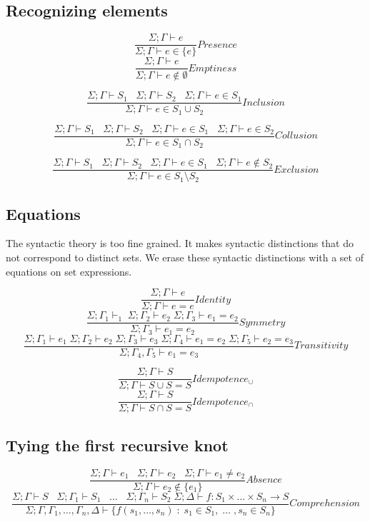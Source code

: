 \subsection{Recognizing elements}
\[\frac{ \Sigma; \Gamma \vdash e }{ \Sigma; \Gamma \vdash e \in \{ e \}}Presence\]
\[\frac{ \Sigma; \Gamma \vdash e }{ \Sigma; \Gamma \vdash e \notin \emptyset}Emptiness\]

\[\frac{ \Sigma; \Gamma \vdash S_{1} \;\;\; \Sigma; \Gamma \vdash S_{2} \;\;\; \Sigma; \Gamma \vdash e \in S_{1}}{ \Sigma; \Gamma \vdash e \in S_{1} \cup S_{2}}Inclusion\]

\[\frac{ \Sigma; \Gamma \vdash S_{1} \;\;\; \Sigma; \Gamma \vdash S_{2} \;\;\; \Sigma; \Gamma \vdash e \in S_{1} \;\;\; \Sigma; \Gamma \vdash e \in S_{2}}{ \Sigma; \Gamma \vdash e \in S_{1} \cap S_{2}}Collusion\]

\[\frac{ \Sigma; \Gamma \vdash S_{1} \;\;\; \Sigma; \Gamma \vdash S_{2} \;\;\; \Sigma; \Gamma \vdash e \in S_{1} \;\;\; \Sigma; \Gamma \vdash e \notin S_{2}}{ \Sigma; \Gamma \vdash e \in S_{1} \setminus S_{2}}Exclusion\]

\subsection{Equations}\label{equations}

The syntactic theory is too fine grained. It makes syntactic
distinctions that do not correspond to distinct sets. We erase these
syntactic distinctions with a set of equations on set expressions.

\[\frac{ \Sigma; \Gamma \vdash e }{ \Sigma; \Gamma  \vdash e = e}Identity\]
\[\frac{\Sigma; \Gamma_{1} \vdash _{1}\; \Sigma; \Gamma_{2} \vdash e_{2}\; \Sigma; \Gamma_{3}  \vdash e_{1} = e_{2}}{ \Sigma; \Gamma_{3}  \vdash e_{1} = e_{2}}Symmetry\]
\[\frac{\Sigma; \Gamma_{1}  \vdash e_{1}\; \Sigma; \Gamma_{2}  \vdash e_{2}\; \Sigma; \Gamma_{3} \vdash e_{3}\; \Sigma; \Gamma_{4}  \vdash e_{1} = e_{2} \; \Sigma; \Gamma_{5}  \vdash e_{2} = e_{3}}{ \Sigma; \Gamma_{4},\Gamma_{5}  \vdash e_{1} = e_{3}}Transitivity\]

\[\frac{\Sigma; \Gamma  \vdash S}{\Sigma; \Gamma \vdash S \cup S =  S}Idempotence_{\cup}\]
\[\frac{\Sigma; \Gamma  \vdash S}{\Sigma; \Gamma \vdash S \cap S =  S}Idempotence_{\cap}\]

\subsection{Tying the first recursive knot}
\[\frac{ \Sigma; \Gamma \vdash e_{1} \;\;\; \Sigma; \Gamma \vdash e_{2} \;\;\; \Sigma; \Gamma \vdash e_{1} \neq e_{2} }{ \Sigma; \Gamma \vdash e_{2} \notin \{ e_{1}\}}Absence\]
\[\frac{ \Sigma; \Gamma \vdash S \;\;\; \Sigma; \Gamma_{1} \vdash S_{1} \;\;\;\ldots\;\;\; \Sigma; \Gamma_{n} \vdash S_{2}\; \Sigma; \Delta \vdash f : S_{1} \times \ldots \times S_{n} \to S }{ \Sigma; \Gamma,\Gamma_{1},\ldots, \Gamma_{n},\Delta \vdash \{ f(s_{1},\ldots,s_{n}) \; : \; s_{1} \in S_{1},\; \ldots\;, s_{n} \in S_{n}\}}Comprehension\]

